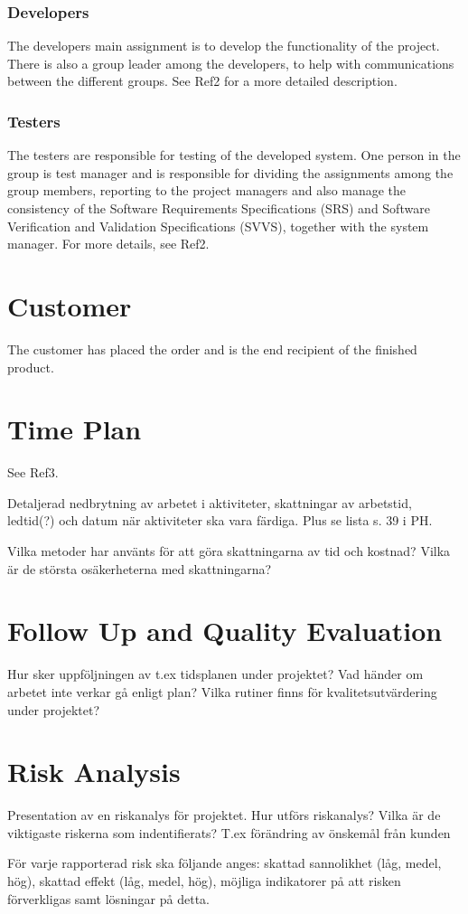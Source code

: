 \documentclass[a4paper]{article}
\begin{document}
\subsubsection{Developers}
The developers main assignment is to develop the functionality of the project. There is also a group leader among the developers, to help with communications between the different groups. See Ref2 for a more detailed description.

\subsubsection{Testers}
The testers are responsible for testing of the developed system. One person in the group is test manager and is responsible for dividing the assignments among the group members, reporting to the project managers and also manage the consistency of the Software Requirements Specifications (SRS) and Software Verification and Validation Specifications (SVVS), together with the system manager. For more details, see Ref2.

\section{Customer}
The customer has placed the order and is the end recipient of the finished product.

\section{Time Plan}
See Ref3.

Detaljerad nedbrytning av arbetet i aktiviteter, skattningar av arbetstid, ledtid(?) och datum när aktiviteter ska vara färdiga. Plus se lista s. 39 i PH.

Vilka metoder har använts för att göra skattningarna av tid och kostnad? Vilka är de största osäkerheterna med skattningarna?


\section{Follow Up and Quality Evaluation}

Hur sker uppföljningen av t.ex tidsplanen under projektet? Vad händer om arbetet inte verkar gå enligt plan? Vilka rutiner finns för kvalitetsutvärdering under projektet?


\section{Risk Analysis}

Presentation av en riskanalys för projektet. Hur utförs riskanalys? Vilka är de viktigaste riskerna som indentifierats? T.ex förändring av önskemål från kunden

För varje rapporterad risk ska följande anges: skattad sannolikhet (låg, medel, hög), skattad effekt (låg, medel, hög), möjliga indikatorer på att risken förverkligas samt lösningar på detta.
\end{document}
